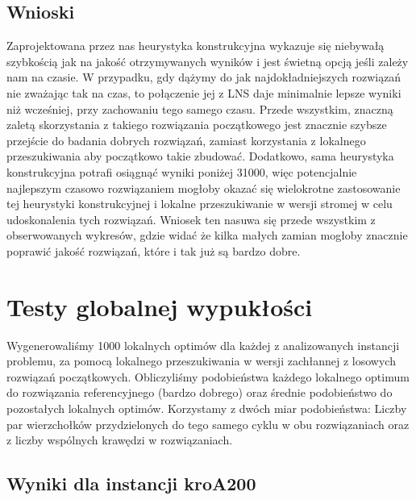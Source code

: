 \documentclass[11pt]{article}
\begin{document}
\subsection{Wnioski}\label{subsec:wnioski}
Zaprojektowana przez nas heurystyka konstrukcyjna wykazuje się niebywałą szybkością jak na jakość otrzymywanych wyników i jest świetną opcją jeśli zależy nam na czasie.
W przypadku, gdy dążymy do jak najdokładniejszych rozwiązań nie zważając tak na czas, to połączenie jej z LNS daje minimalnie lepsze wyniki niż wcześniej, przy zachowaniu tego samego czasu.
Przede wszystkim, znaczną zaletą skorzystania z takiego rozwiązania początkowego jest znacznie szybsze przejście do badania dobrych rozwiązań, zamiast korzystania z lokalnego przeszukiwania aby początkowo takie zbudować.
Dodatkowo, sama heurystyka konstrukcyjna potrafi osiągnąć wyniki poniżej 31000, więc potencjalnie najlepszym czasowo rozwiązaniem mogłoby okazać się wielokrotne zastosowanie tej heurystyki konstrukcyjnej i lokalne przeszukiwanie w wersji stromej w celu udoskonalenia tych rozwiązań.
Wniosek ten nasuwa się przede wszystkim z obserwowanych wykresów, gdzie widać że kilka małych zamian mogłoby znacznie poprawić jakość rozwiązań, które i tak już są bardzo dobre.


\section{Testy globalnej wypukłości}\label{sec:testy-globalnej-wypukosci}

Wygenerowaliśmy 1000 lokalnych optimów dla każdej z analizowanych instancji problemu, za pomocą lokalnego przeszukiwania w wersji zachłannej z losowych rozwiązań początkowych.
Obliczyliśmy podobieństwa każdego lokalnego optimum do rozwiązania referencyjnego (bardzo dobrego) oraz średnie podobieństwo do pozostałych lokalnych optimów.
Korzystamy z dwóch miar podobieństwa: Liczby par wierzchołków przydzielonych do tego samego cyklu w obu rozwiązaniach oraz z liczby wspólnych krawędzi w rozwiązaniach.

\subsection{Wyniki dla instancji kroA200}\label{subsec:wyniki-dla-instancji-kroa200}
\end{document}
